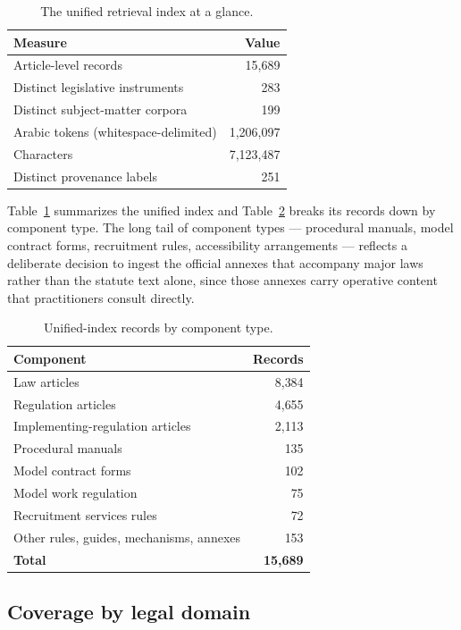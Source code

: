 \documentclass[sn-basic]{sn-jnl}%
\begin{document}
\begin{table}[t]
\centering
\small
\begin{tabular}{lr}
\toprule
\textbf{Measure} & \textbf{Value} \\
\midrule
Article-level records & 15{,}689 \\
Distinct legislative instruments & 283 \\
Distinct subject-matter corpora & 199 \\
Arabic tokens (whitespace-delimited) & 1{,}206{,}097 \\
Characters & 7{,}123{,}487 \\
Distinct provenance labels & 251 \\
\bottomrule
\end{tabular}
\caption{The unified retrieval index at a glance.}
\label{tab:index}
\end{table}

Table~\ref{tab:index} summarizes the unified index and
Table~\ref{tab:components} breaks its records down by component type. The
long tail of component types --- procedural manuals, model contract forms,
recruitment rules, accessibility arrangements --- reflects a deliberate
decision to ingest the official annexes that accompany major laws rather
than the statute text alone, since those annexes carry operative content
that practitioners consult directly.

\begin{table}[t]
\centering
\small
\begin{tabular}{lr}
\toprule
\textbf{Component} & \textbf{Records} \\
\midrule
Law articles & 8{,}384 \\
Regulation articles & 4{,}655 \\
Implementing-regulation articles & 2{,}113 \\
Procedural manuals & 135 \\
Model contract forms & 102 \\
Model work regulation & 75 \\
Recruitment services rules & 72 \\
Other rules, guides, mechanisms, annexes & 153 \\
\midrule
\textbf{Total} & \textbf{15{,}689} \\
\bottomrule
\end{tabular}
\caption{Unified-index records by component type.}
\label{tab:components}
\end{table}

\subsection{Coverage by legal domain}
\end{document}
